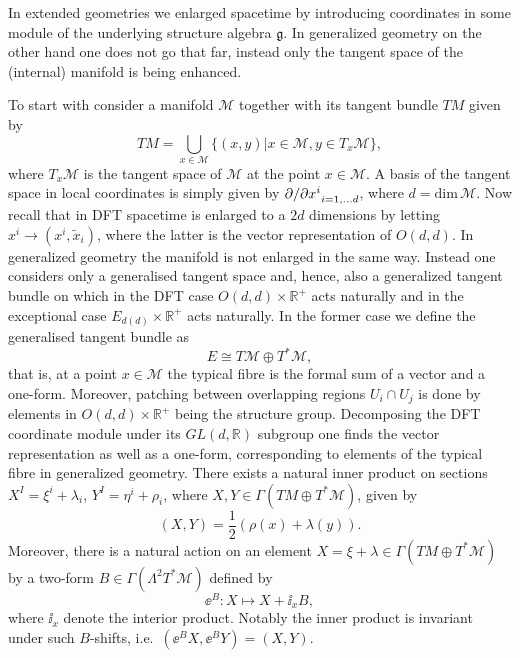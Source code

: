 In extended geometries we enlarged spacetime by introducing coordinates in some module of the underlying structure algebra $\mathfrak{g}$. In generalized geometry on the other hand one does not go that far, instead only the tangent space of the (internal) manifold is being enhanced. 

To start with consider a manifold $\mathcal{M}$ together with its tangent bundle $TM$ given by 
\begin{equation}
    TM = \bigcup_{x\in \mathcal{M}}\{(x,y)|x\in\mathcal{M}, y\in T_x\mathcal{M} \},
\end{equation}
where $T_x\mathcal{M}$ is the tangent space of $\mathcal{M}$ at the point $x\in\mathcal{M}$. A basis of the tangent space in local coordinates is simply given by ${\partial/\partial x^i}_{i=1,\ldots d}$, where $d=\text{dim}\,\mathcal{M}$. Now recall that in DFT spacetime is enlarged to a $2d$ dimensions by letting $x^i\to (x^i,\tilde{x}_i)$, where the latter is the vector representation of $O(d,d)$. In generalized geometry the manifold is not enlarged in the same way. Instead one considers only a generalised tangent space and, hence, also a generalized tangent bundle on which in the DFT case $O(d,d)\times \mathbb{R}^+$ acts naturally and in the exceptional case $E_{d(d)}\times\mathbb{R}^+$ acts naturally.  In the former case we define the generalised tangent bundle as 
\begin{equation}
    E\cong T\mathcal{M}\oplus T^*\mathcal{M},
\end{equation}
that is, at a point $x\in\mathcal{M}$ the typical fibre is the formal sum of a vector and a one-form. Moreover, patching between overlapping regions $U_i\cap U_j$ is done by elements in $O(d,d)\times\mathbb{R}^+$ being the structure group. Decomposing the DFT coordinate module under its $GL(d,\mathbb{R})$ subgroup one finds the vector representation as well as a one-form, corresponding to elements of the typical fibre in generalized geometry. There exists a natural inner product on sections $X^I=\xi^i+\lambda_i$, $Y^I=\eta^i+\rho_i$, where $X,Y\in\Gamma(TM\oplus T^*\mathcal{M})$, given by
\begin{equation}
    (X,Y) = \frac{1}{2}\left(\rho(x)+\lambda(y)\right).
\end{equation}
Moreover, there is a natural action on an element $X=\xi+\lambda\in \Gamma(TM\oplus T^*\mathcal{M})$ by a two-form $B\in \Gamma(\Lambda^2T^*\mathcal{M})$ defined by 
\begin{equation}
    \ee^B: X\mapsto X+\ii_xB,
\end{equation}
where $\ii_x$ denote the interior product. Notably the inner product is invariant under such $B$-shifts, i.e.\ $(\ee^BX,\ee^BY)=(X,Y)$.

